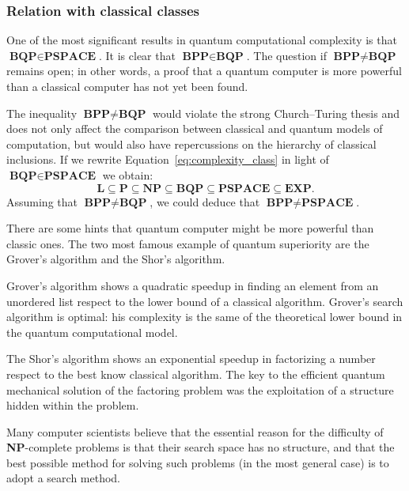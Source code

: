 \subsubsection*{Relation with classical classes}
\label{sec:clas_rel}
One of the most significant results in quantum computational complexity is that $\textbf{BQP} \in \textbf{PSPACE}$. It is clear that $\textbf{BPP} \in \textbf{BQP}$. The question if $\textbf{BPP} \neq \textbf{BQP}$ remains open; in other words, a proof that a quantum computer is more powerful than a classical computer has not yet been found.

The inequality $\textbf{BPP} \neq \textbf{BQP}$ would violate the strong Church–Turing thesis and  does not only affect the comparison between classical and quantum models of computation, but would also have repercussions on the hierarchy of classical inclusions. If we rewrite Equation~\ref{eq:complexity_class} in light of $\textbf{BQP} \in \textbf{PSPACE}$ we obtain:
\begin{equation}
	\textbf{L} \subseteq \textbf{P} \subseteq \textbf{NP} \subseteq \textbf{BQP}  \subseteq  \textbf{PSPACE} \subseteq \textbf{EXP}.
	\label{eq:complexity_class_q}
\end{equation}
Assuming that $\textbf{BPP} \neq \textbf{BQP}$, we could deduce that  $\textbf{BPP} \neq \textbf{PSPACE}$.

There are some hints that quantum computer might be more powerful than classic ones. The two most famous example of quantum superiority are the Grover's algorithm and the Shor's algorithm.

Grover's algorithm shows a quadratic speedup in finding an element from an unordered list respect to the lower bound of a classical algorithm. Grover's search algorithm is optimal: his complexity is the same of the theoretical lower bound in the quantum computational model.

The Shor's algorithm shows an exponential speedup in factorizing a number respect to the best know classical algorithm. The key to the efficient quantum mechanical solution of the factoring problem was the exploitation of a structure hidden within the problem.

Many  computer scientists  believe that the essential reason for the difficulty of \textbf{NP}-complete problems is that their search space has no structure, and that the best possible method for solving such problems (in the most general case) is to adopt a search method.

